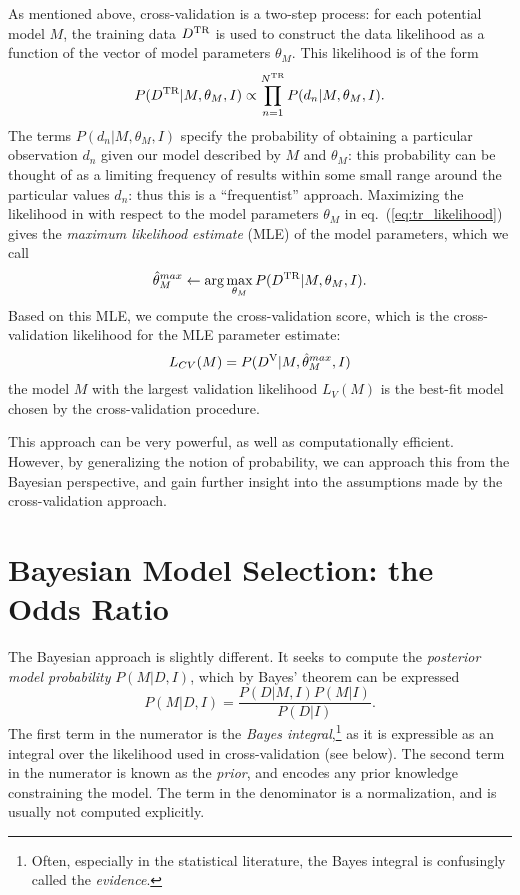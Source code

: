 \documentclass[12pt,pdftex]{article}
\newcommand{\Dtr}{\ensuremath{D^{\rm TR}}}
\newcommand{\Dva}{\ensuremath{D^{\rm V}}}
\newcommand{\eqn}[1]{eq.~(\ref{eq:#1})}
\begin{document}
As mentioned above, cross-validation is a two-step process:
for each potential model $M$, the
training data \Dtr{} is used to construct the data likelihood as a function
of the vector of model parameters $\theta_M$.  This likelihood is of the form
\begin{equation}
  \label{eq:tr_likelihood}
  P(\Dtr|M, \theta_M, I) \propto \prod_{n=1}^{N^{\rm TR}}P(d_n|M, \theta_M, I).
\end{equation}
The terms $P(d_n|M, \theta_M, I)$ specify the probability of obtaining a
particular observation $d_n$ given our model described by $M$ and $\theta_M$:
this probability can be thought of as a limiting frequency of results within
some small range around the particular values $d_n$: thus this is a
``frequentist'' approach.
Maximizing the likelihood in with respect to the model parameters $\theta_M$
in \eqn{tr_likelihood} gives the {\it maximum likelihood estimate} (MLE)
of the model parameters, which we call
\begin{equation}
  \hat{\theta}_M^{max} \leftarrow \arg\max_{\theta_M} P(\Dtr|M, \theta_M, I).
\end{equation}
Based on this MLE, we compute the cross-validation score, which is the
cross-validation likelihood for the MLE parameter estimate:
\begin{equation}
  \label{eq:CV_likelihood}
  L_{CV}(M) = P(\Dva|M, \hat{\theta}_M^{max}, I)
\end{equation}
the model $M$ with the largest validation likelihood $L_{V}(M)$ is the
best-fit model chosen by the cross-validation procedure.

This approach can be very powerful, as well as computationally efficient.
However, by generalizing the notion of probability, we can approach this
from the Bayesian perspective, and gain further insight into the assumptions
made by the cross-validation approach.

\section{Bayesian Model Selection: the Odds Ratio}
The Bayesian approach is slightly different.  It seeks to compute the
{\it posterior model probability} $P(M|D,I)$, which by Bayes' theorem
can be expressed
\begin{equation}
  \label{eq:bayes_theorem}
  P(M|D,I) = \frac{P(D|M,I)P(M|I)}{P(D|I)}.
\end{equation}
The first term in the numerator is the {\it Bayes integral},\footnote{
Often, especially in the statistical literature,
the Bayes integral is confusingly called the {\it evidence}.}
as it is expressible as an integral over the likelihood used
in cross-validation (see below).
The second term in the numerator is known
as the {\it prior}, and encodes any prior knowledge constraining the model.
The term in the denominator is a normalization, and is usually not
computed explicitly.
\end{document}
